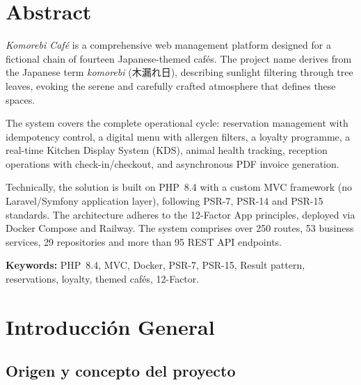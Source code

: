\documentclass[12pt,a4paper,twoside,openright]{report}
\begin{document}
\chapter*{Abstract}

\textit{Komorebi Café} is a comprehensive web management platform designed for a
fictional chain of fourteen Japanese-themed cafés. The project name derives from the
Japanese term \textit{komorebi} (木漏れ日), describing sunlight filtering through tree
leaves, evoking the serene and carefully crafted atmosphere that defines these spaces.

The system covers the complete operational cycle: reservation management with idempotency
control, a digital menu with allergen filters, a loyalty programme, a real-time Kitchen
Display System (KDS), animal health tracking, reception operations with check-in/checkout,
and asynchronous PDF invoice generation.

Technically, the solution is built on PHP~8.4 with a custom MVC framework (no
Laravel/Symfony application layer), following PSR-7, PSR-14 and PSR-15 standards.
The architecture adheres to the 12-Factor App principles, deployed via Docker Compose
and Railway. The system comprises over 250 routes, 53 business services, 29 repositories
and more than 95 REST API endpoints.

\bigskip
\textbf{Keywords:} PHP~8.4, MVC, Docker, PSR-7, PSR-15, Result pattern, reservations,
loyalty, themed cafés, 12-Factor.

\tableofcontents
\listoffigures
\listoftables

\clearpage
{}
\pagestyle{fancy}

\chapter{Introducción General}
\label{chap:intro}

\section{Origen y concepto del proyecto}
\label{sec:origen}
\end{document}
